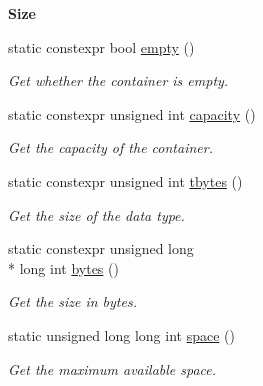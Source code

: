 \begin{Indent}{\bf Size}\par
\begin{DoxyCompactItemize}
\item 
static constexpr bool \hyperlink{classmagrathea_1_1StaticVectorizer_a2a7178a1eb856275555049c9ec5df656}{empty} ()
\begin{DoxyCompactList}\small\item\em Get whether the container is empty. \end{DoxyCompactList}\item 
static constexpr unsigned int \hyperlink{classmagrathea_1_1StaticVectorizer_a0ffe27d8a71e308c00b3b3f2a85e1be5}{capacity} ()
\begin{DoxyCompactList}\small\item\em Get the capacity of the container. \end{DoxyCompactList}\item 
static constexpr unsigned int \hyperlink{classmagrathea_1_1StaticVectorizer_ab06780534568f370bf271ee8eedadccf}{tbytes} ()
\begin{DoxyCompactList}\small\item\em Get the size of the data type. \end{DoxyCompactList}\item 
static constexpr unsigned long \\*
long int \hyperlink{classmagrathea_1_1StaticVectorizer_ab2b5f40970d8e4f5481041f2f79d34fc}{bytes} ()
\begin{DoxyCompactList}\small\item\em Get the size in bytes. \end{DoxyCompactList}\item 
static unsigned long long int \hyperlink{classmagrathea_1_1StaticVectorizer_aa027feb6ed321fd9cd855e0cdb0207b5}{space} ()
\begin{DoxyCompactList}\small\item\em Get the maximum available space. \end{DoxyCompactList}\end{DoxyCompactItemize}
\end{Indent}
